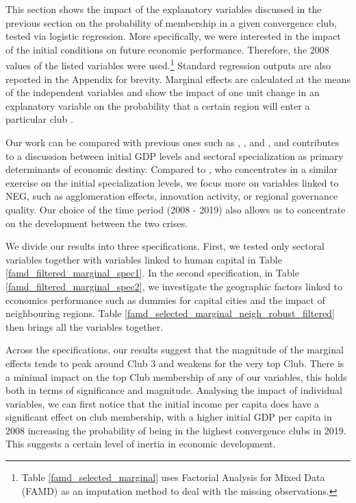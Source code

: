 \documentclass[11pt]{article}
\begin{document}
This section shows the impact of the explanatory variables discussed in the previous section on the probability of membership in a given convergence club, tested via logistic regression. More specifically, we were interested in the impact of the initial conditions on future economic performance. Therefore, the 2008 values of the listed variables were used.\footnote{Table \ref{famd_selected_marginal} uses Factorial Analysis for Mixed Data (FAMD) as an imputation method to deal with the missing observations.}  Standard regression outputs are also reported in the Appendix for brevity. Marginal effects are calculated at the means of the independent variables and show the impact of one unit change in an explanatory variable on the probability that a certain region will enter a particular club \citep{carrolloglmx}.

Our work can be compared with previous ones such as \citet{cutrini2019economic}, \citet{von2017regional}, and \citet{bartkowska2012regional}, and contributes to a discussion between initial GDP levels and sectoral specialization as primary determinants of economic destiny. Compared to \citet{cutrini2019economic}, who concentrates in a similar exercise on the initial specialization levels, we focus more on variables linked to NEG, such as agglomeration effects, innovation activity, or regional governance quality. Our choice of the time period (2008 - 2019) also allows us to concentrate on the development between the two crises. 

We divide our results into three specifications. First, we tested only sectoral variables together with variables linked to human capital in Table \ref{famd_filtered_marginal_spec1}. In the second specification, in Table \ref{famd_filtered_marginal_spec2},  we investigate the geographic factors linked to economics performance such as dummies for capital cities and the impact of neighbouring regions. Table \ref{famd_selected_marginal_neigh_robust_filtered} then brings all the variables together.

Across the specifications, our results suggest that the magnitude of the marginal effects tends to peak around Club 3 and weakens for the very top Club. There is a minimal impact on the top Club membership of any of our variables, this holds both in terms of significance and magnitude. 
Analysing the impact of individual variables, we can first notice that the initial income per capita does have a significant effect on club membership, with a higher initial GDP per capita in 2008 increasing the probability of being in the highest convergence clubs in 2019. This suggests a certain level of inertia in economic development.
 
\end{document}
